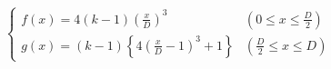 \documentclass[
  11pt,
  border=2,
  convert={
    density=100 -alpha remove,
    outext=.png
  },
]{standalone}
\begin{document}
$
  \begin{cases}
    \displaystyle f(x) = 4(k-1)\left(\frac{x}{D}\right)^{3}
      & \left(0 \leq x \leq \frac{D}{2}\right)
    \\
    \displaystyle g(x) = (k-1)\left\{4\left(\frac{x}{D} - 1\right)^{3} + 1\right\}
      & \left(\frac{D}{2} \leq x \leq D\right)
  \end{cases}
$
\end{document}

